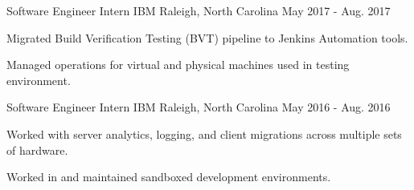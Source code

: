 
\begin{cventries}
	
\cventry
	{Software Engineer Intern} %
	{IBM} %
	{Raleigh, North Carolina} %
	{May 2017 - Aug. 2017} %
	{
		\begin{cvitems} %
			\item {Migrated Build Verification Testing (BVT) pipeline to Jenkins Automation tools.}
			\item {Managed operations for virtual and physical machines used in testing environment.}
		\end{cvitems}
	}
	
\cventry
	{Software Engineer Intern} %
	{IBM} %
	{Raleigh, North Carolina} %
	{May 2016 - Aug. 2016} %
	{
		\begin{cvitems} %
			\item {Worked with server analytics, logging, and client migrations across multiple sets of
				hardware.}
			\item {Worked in and maintained sandboxed development environments.}
		\end{cvitems}
	}


\end{cventries}